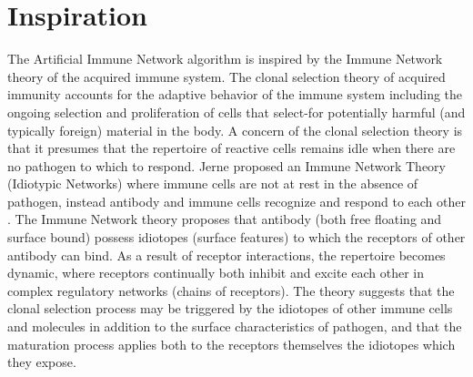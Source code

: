 \documentclass[a4paper, 11pt]{article}
\begin{document}
\section{Inspiration}
\label{sec:inspiration}
The Artificial Immune Network algorithm is inspired by the Immune Network theory of the acquired immune system.
The clonal selection theory of acquired immunity accounts for the adaptive behavior of the immune system including the ongoing selection and proliferation of cells that select-for potentially harmful (and typically foreign) material in the body.
A concern of the clonal selection theory is that it presumes that the repertoire of reactive cells remains idle when there are no pathogen to which to respond. Jerne proposed an Immune Network Theory (Idiotypic Networks) where immune cells are not at rest in the absence of pathogen, instead antibody and immune cells recognize and respond to each other \cite{Jerne1974, Jerne1974a, Jerne1984}. 
The Immune Network theory proposes that antibody (both free floating and surface bound) possess idiotopes (surface features) to which the receptors of other antibody can bind. As a result of receptor interactions, the repertoire becomes dynamic, where receptors continually both inhibit and excite each other in complex regulatory networks (chains of receptors). The theory suggests that the clonal selection process may be triggered by the idiotopes of other immune cells and molecules in addition to the surface characteristics of pathogen, and that the maturation process applies both to the receptors themselves the idiotopes which they expose. 

\end{document}
